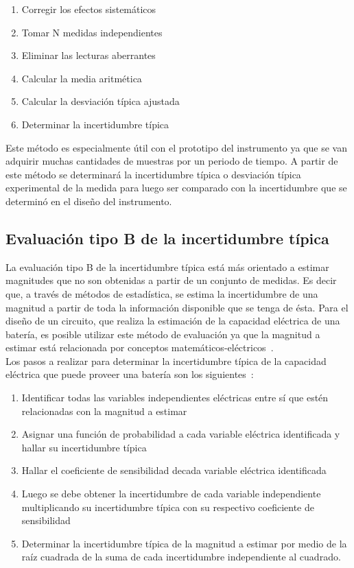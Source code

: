 	\begin{enumerate}
	\item Corregir los efectos sistemáticos
	\item Tomar N medidas independientes
	\item Eliminar las lecturas aberrantes
	\item Calcular la media aritmética 		%
	\item Calcular la desviación típica ajustada	%
	\item Determinar la incertidumbre típica		%
	\end{enumerate}

	Este método es especialmente útil con el prototipo del instrumento ya que se van adquirir muchas cantidades de muestras por un periodo de tiempo. A partir de este método se determinará la incertidumbre típica o desviación típica experimental de la medida para luego ser comparado con la incertidumbre que se determinó en el diseño del instrumento. 

	\subsection{Evaluación tipo B de la incertidumbre típica}

	La evaluación tipo B de la incertidumbre típica está más orientado a estimar magnitudes que no son obtenidas a partir de un conjunto de medidas. Es decir que, a través de métodos de estadística, se estima la incertidumbre de una magnitud a partir de toda la información disponible que se tenga de ésta. Para el diseño de un circuito, que realiza la estimación de la capacidad eléctrica de una batería, es posible utilizar este método de evaluación ya que la magnitud a estimar está relacionada por conceptos matemáticos-eléctricos~\cite{CENTROESPANOLDEMETROLOGIA2008}. \\

	Los pasos a realizar para determinar la incertidumbre típica de la capacidad eléctrica que puede proveer una batería son los siguientes~\cite{CENTROESPANOLDEMETROLOGIA2008}:	

	\begin{enumerate}
	\item Identificar todas las variables independientes eléctricas entre sí que estén relacionadas con la magnitud a estimar
	\item Asignar una función de probabilidad a cada variable eléctrica identificada y hallar su incertidumbre típica
	\item Hallar el coeficiente de sensibilidad decada variable eléctrica identificada
	\item Luego se debe obtener la incertidumbre de cada variable independiente multiplicando su incertidumbre típica con su respectivo coeficiente de sensibilidad
	\item Determinar la incertidumbre típica de la magnitud a estimar por medio de la raíz cuadrada de la suma de cada incertidumbre independiente al cuadrado.
	\end{enumerate}


